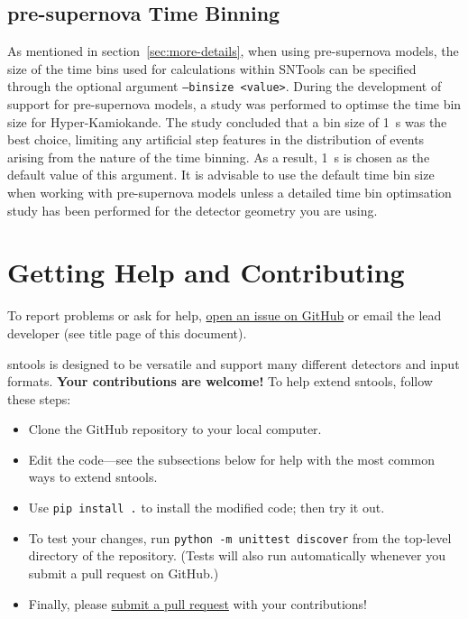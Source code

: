 \documentclass[11pt, oneside]{article}
\begin{document}
\subsection{pre-supernova Time Binning}\label{sec:pre-supernova-time-binning}
As mentioned in section~\ref{sec:more-details}, when using pre-supernova models, the size of the time bins used for calculations within SNTools can be specified through the optional argument \texttt{--binsize <value>}.
During the development of support for pre-supernova models, a study was performed to optimse the time bin size for Hyper-Kamiokande. The study concluded that a bin size of \SI{1}{s} was the best choice,  
limiting any artificial step features in the distribution of events arising from the nature of the time binning. As a result, \SI{1}{s} is chosen as the default value of this argument.
It is advisable to use the default time bin size when working with pre-supernova models unless a detailed time bin optimsation study has been performed for the detector geometry you are using.  

\section{Getting Help and Contributing}

To report problems or ask for help, \href{https://github.com/SNEWS2/sntools/issues}{open an issue on GitHub} or email the lead developer (see title page of this document).

sntools is designed to be versatile and support many different detectors and input formats.
\textbf{Your contributions are welcome!}
To help extend sntools, follow these steps:

\begin{itemize}
	\item Clone the GitHub repository to your local computer.
	\item Edit the code---see the subsections below for help with the most common ways to extend sntools.
	\item Use \texttt{pip install .} to install the modified code; then try it out.
	\item To test your changes, run \texttt{python -m unittest discover} from the top-level directory of the repository. (Tests will also run automatically whenever you submit a pull request on GitHub.)
	\item Finally, please \href{https://docs.github.com/en/github/collaborating-with-issues-and-pull-requests/about-pull-requests}{submit a pull request} with your contributions!
\end{itemize}
\end{document}
